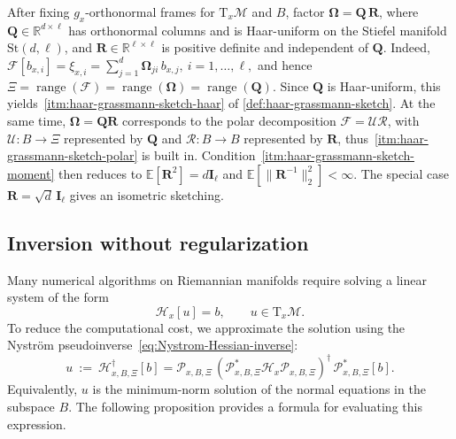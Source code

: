 \documentclass[final,onefignum,onetabnum]{siamart250211}
\begin{document}
After fixing $g_x$-orthonormal frames for $\mathrm T_x\mathcal M$ and $B$, factor
$\mathbf{\Omega}=\mathbf{Q}\,\mathbf{R}$, where $\mathbf{Q}\in\mathbb R^{d\times\ell}$ has orthonormal columns and is Haar-uniform on the Stiefel manifold $\mathrm{St}(d,\ell)$, and $\mathbf{R}\in\mathbb R^{\ell\times\ell}$ is positive definite and independent of $\mathbf{Q}$.
Indeed,
$
  \mathcal F[b_{x,i}]=\xi_{x,i}=\sum_{j=1}^d \mathbf{\Omega}_{ji}\,b_{x,j},\  i=1,\dots,\ell,
$
and hence $\Xi=\operatorname{range}(\mathcal F)=\operatorname{range}(\mathbf{\Omega})=\operatorname{range}(\mathbf{Q})$.
Since $\mathbf{Q}$ is Haar-uniform, this yields~\ref{itm:haar-grassmann-sketch-haar} of \cref{def:haar-grassmann-sketch}.
At the same time, $\mathbf{\Omega}=\mathbf{Q}\mathbf{R}$ corresponds to the polar decomposition $\mathcal F=\mathcal U\mathcal R$, with $\mathcal U:B\to \Xi$ represented by $\mathbf{Q}$ and $\mathcal R:B\to B$ represented by $\mathbf{R}$, thus~\ref{itm:haar-grassmann-sketch-polar} is built in.
Condition~\ref{itm:haar-grassmann-sketch-moment} then reduces to $\mathbb E[\mathbf{R}^2]=d \mathbf{I}_\ell$ and $\mathbb E[\|\mathbf{R}^{-1}\|_2^2]<\infty$.
The special case $\mathbf{R} = \sqrt{d}\, \mathbf{I}_\ell$ gives an isometric sketching.

\subsection{Inversion without regularization}
Many numerical algorithms on Riemannian manifolds require solving a linear system of the form
\begin{equation}
\label{eq:tx-linear-system}
\mathcal{H}_x[u]=b,\qquad u\in \mathrm{T}_x\mathcal M.
\end{equation}
To reduce the computational cost, we approximate the solution using the Nystr\"om pseudoinverse~\eqref{eq:Nystrom-Hessian-inverse}:
\[
u\ :=\ \mathcal{H}_{x,B,\Xi}^{\dagger}[b]
=\mathcal{P}_{x,B,\Xi}\,(\mathcal{P}_{x,B,\Xi}^{*}\mathcal{H}_x\mathcal{P}_{x,B,\Xi})^{\dagger}\,\mathcal{P}_{x,B,\Xi}^{*}[b].
\]
Equivalently, $u$ is the minimum-norm solution of the normal equations in the subspace $B$.
The following proposition provides a formula for evaluating this expression.
\end{document}
